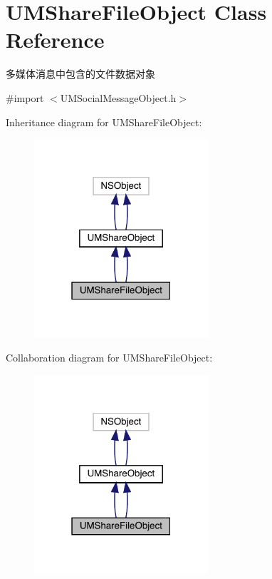 \hypertarget{interface_u_m_share_file_object}{}\section{U\+M\+Share\+File\+Object Class Reference}
\label{interface_u_m_share_file_object}


多媒体消息中包含的文件数据对象  




{\ttfamily \#import $<$U\+M\+Social\+Message\+Object.\+h$>$}



Inheritance diagram for U\+M\+Share\+File\+Object\+:\nopagebreak
\begin{figure}[H]
\begin{center}
\leavevmode
\includegraphics[width=183pt]{interface_u_m_share_file_object__inherit__graph}
\end{center}
\end{figure}


Collaboration diagram for U\+M\+Share\+File\+Object\+:\nopagebreak
\begin{figure}[H]
\begin{center}
\leavevmode
\includegraphics[width=183pt]{interface_u_m_share_file_object__coll__graph}
\end{center}
\end{figure}
